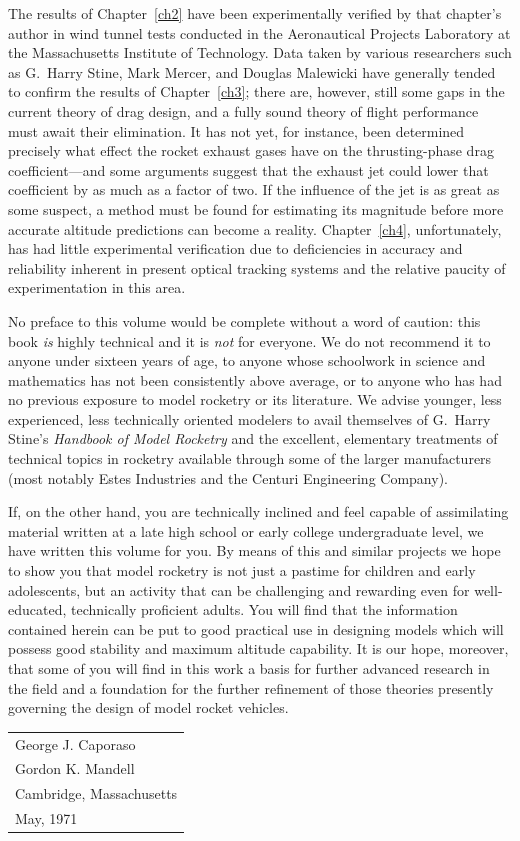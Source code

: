 The results of Chapter~\ref{ch2} have been experimentally verified by that chapter's author in wind tunnel
tests conducted in the Aeronautical Projects Laboratory at the Massachusetts Institute of Technology. Data
taken by various researchers such as G.~Harry Stine, Mark Mercer, and Douglas Malewicki have generally tended
to confirm the results of Chapter~\ref{ch3}; there are, however, still some gaps in the current theory of drag
design, and a fully sound theory of flight performance must await their elimination. It has not yet, for
instance, been determined precisely what effect the rocket exhaust gases have on the thrusting-phase drag
coefficient---and some arguments suggest that the exhaust jet could lower that coefficient by as much as a
factor of two. If the influence of the jet is as great as some suspect, a method must be found for estimating
its magnitude before more accurate altitude predictions can become a reality. Chapter~\ref{ch4},
unfortunately, has had little experimental verification due to deficiencies in accuracy and reliability
inherent in present optical tracking systems and the relative paucity of experimentation in this area.

No preface to this volume would be complete without a word of caution: this book \emph{is} highly technical
and it is \emph{not} for everyone. We do not recommend it to anyone under sixteen years of age, to anyone whose
schoolwork in science and mathematics has not been consistently above average, or to anyone who has had no
previous exposure to model rocketry or its literature. We advise younger, less experienced, less technically
oriented modelers to avail themselves of G.~Harry Stine's \emph{Handbook of Model Rocketry} and the excellent,
elementary treatments of technical topics in rocketry available through some of the larger manufacturers (most
notably Estes Industries and the Centuri Engineering Company).

If, on the other hand, you are technically inclined and feel capable of assimilating material written at a
late high school or early college undergraduate level, we have written this volume for you. By means of this
and similar projects we hope to show you that model rocketry is not just a pastime for children and early
adolescents, but an activity that can be challenging and rewarding even for well-educated, technically
proficient adults. You will find that the information contained herein can be put to good practical use in
designing models which will possess good stability and maximum altitude capability. It is our hope, moreover,
that some of you will find in this work a basis for further advanced research in the field and a foundation
for the further refinement of those theories presently governing the design of model rocket vehicles.

\begin{flushright}
  \begin{tabular}{@{}l@{}}
    George J. Caporaso\\
    Gordon K. Mandell\\[0.8em]
    Cambridge, Massachusetts\\
    May, 1971
  \end{tabular}\hspace*{3em}
\end{flushright}
